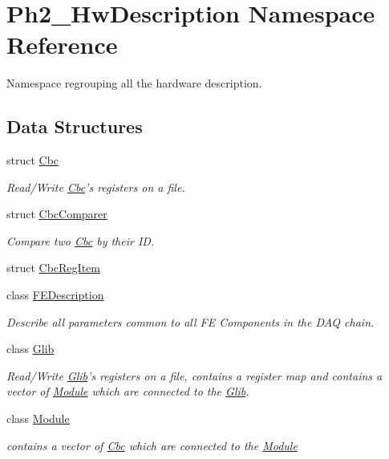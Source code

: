 \hypertarget{namespace_ph2___hw_description}{\section{Ph2\-\_\-\-Hw\-Description Namespace Reference}
\label{namespace_ph2___hw_description}
}


Namespace regrouping all the hardware description.  


\subsection*{Data Structures}
\begin{DoxyCompactItemize}
\item 
struct \hyperlink{class_ph2___hw_description_1_1_cbc}{Cbc}
\begin{DoxyCompactList}\small\item\em Read/\-Write \hyperlink{class_ph2___hw_description_1_1_cbc}{Cbc}'s registers on a file. \end{DoxyCompactList}\item 
struct \hyperlink{struct_ph2___hw_description_1_1_cbc_comparer}{Cbc\-Comparer}
\begin{DoxyCompactList}\small\item\em Compare two \hyperlink{class_ph2___hw_description_1_1_cbc}{Cbc} by their I\-D. \end{DoxyCompactList}\item 
struct \hyperlink{struct_ph2___hw_description_1_1_cbc_reg_item}{Cbc\-Reg\-Item}
\item 
class \hyperlink{class_ph2___hw_description_1_1_f_e_description}{F\-E\-Description}
\begin{DoxyCompactList}\small\item\em Describe all parameters common to all F\-E Components in the D\-A\-Q chain. \end{DoxyCompactList}\item 
class \hyperlink{class_ph2___hw_description_1_1_glib}{Glib}
\begin{DoxyCompactList}\small\item\em Read/\-Write \hyperlink{class_ph2___hw_description_1_1_glib}{Glib}'s registers on a file, contains a register map and contains a vector of \hyperlink{class_ph2___hw_description_1_1_module}{Module} which are connected to the \hyperlink{class_ph2___hw_description_1_1_glib}{Glib}. \end{DoxyCompactList}\item 
class \hyperlink{class_ph2___hw_description_1_1_module}{Module}
\begin{DoxyCompactList}\small\item\em contains a vector of \hyperlink{class_ph2___hw_description_1_1_cbc}{Cbc} which are connected to the \hyperlink{class_ph2___hw_description_1_1_module}{Module} \end{DoxyCompactList}\end{DoxyCompactItemize}
